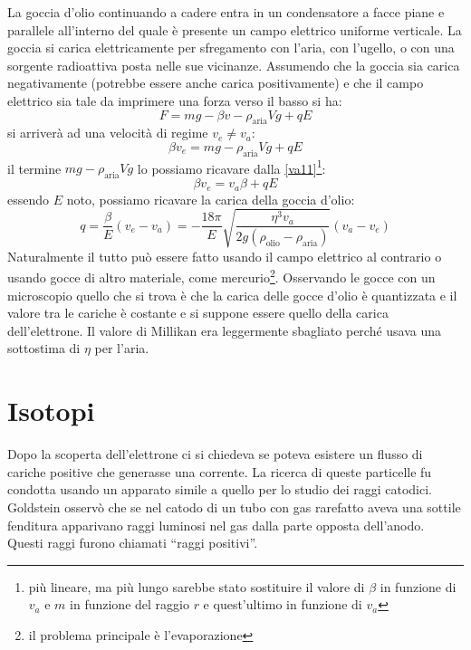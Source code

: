 La goccia d'olio continuando a cadere entra in un condensatore a facce piane e parallele all'interno del quale è presente un campo elettrico uniforme verticale. La goccia si carica elettricamente per sfregamento con l'aria, con l'ugello, o con una sorgente radioattiva posta nelle sue vicinanze. Assumendo che la goccia sia carica negativamente (potrebbe essere anche carica positivamente) e che il campo elettrico sia tale da imprimere una forza verso il basso si ha:
\begin{equation}
	F=mg-\beta v-\rho_\text{aria}Vg+qE
\end{equation}
si arriverà ad una velocità di regime $v_e\neq v_a$:
\begin{equation}
	\beta v_e=mg-\rho_\text{aria}Vg+qE
\end{equation}
il termine $mg-\rho_\text{aria}Vg$ lo possiamo ricavare dalla \eqref{va11}\footnote{più lineare, ma più lungo sarebbe stato sostituire il valore di $\beta$ in funzione di $v_a$ e $m$ in funzione del raggio $r$ e quest'ultimo in funzione di $v_a$}:
\begin{equation}
	\beta v_e=v_a\beta+qE
\end{equation}
essendo $E$ noto, possiamo ricavare la carica della goccia d'olio:
\begin{equation}
	q=\frac{\beta}{E}(v_e-v_a)=-\frac{18\pi}{E}\sqrt{\frac{\eta^3v_a}{2g\left(\rho_\text{olio}-\rho_\text{aria}\right)}}\left(v_a-v_e\right)
\end{equation}
Naturalmente il tutto può essere fatto usando il campo elettrico al contrario o usando gocce di altro materiale, come mercurio\footnote{il problema principale è l'evaporazione}. Osservando le gocce con un microscopio quello che si trova è che la carica delle gocce d'olio è quantizzata e il valore tra le cariche è costante e si suppone essere quello della carica dell'elettrone. Il valore di Millikan era leggermente sbagliato perché usava una sottostima di $\eta$ per l'aria.

\section{Isotopi}
Dopo la scoperta dell'elettrone ci si chiedeva se poteva esistere un flusso di cariche positive che generasse una corrente. La ricerca di queste particelle fu condotta usando un apparato simile a quello per lo studio dei raggi catodici. Goldstein osservò che se nel catodo di un tubo con gas rarefatto aveva una sottile fenditura apparivano raggi luminosi nel gas dalla parte opposta dell'anodo. Questi raggi furono chiamati ``raggi positivi''.

